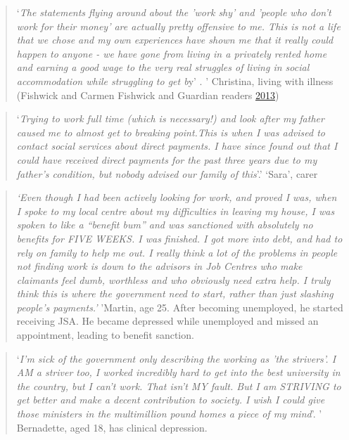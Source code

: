 \documentclass[]{tufte-handout}
\begin{document}
\begin{quote}
`\emph{The statements flying around about the 'work shy' and 'people who
don't work for their money' are actually pretty offensive to me. This is
not a life that we chose and my own experiences have shown me that it
really could happen to anyone - we have gone from living in a privately
rented home and earning a good wage to the very real struggles of living
in social accommodation while struggling to get b}y' . ' Christina,
living with illness (Fishwick and Carmen Fishwick and Guardian readers
\protect\hyperlink{ref-Fishwick2013}{2013})
\end{quote}

\begin{quote}
`\emph{Trying to work full time (which is necessary!) and look after my
father caused me to almost get to breaking point.This is when I was
advised to contact social services about direct payments. I have since
found out that I could have received direct payments for the past three
years due to my father's condition, but nobody advised our family of
this}'.' `Sara', carer
\end{quote}

\begin{quote}
\emph{`Even though I had been actively looking for work, and proved I
was, when I spoke to my local centre about my difficulties in leaving my
house, I was spoken to like a ``benefit bum'' and was sanctioned with
absolutely no benefits for FIVE WEEKS. I was finished. I got more into
debt, and had to rely on family to help me out. I really think a lot of
the problems in people not finding work is down to the advisors in Job
Centres who make claimants feel dumb, worthless and who obviously need
extra help. I truly think this is where the government need to start,
rather than just slashing people's payments.'} 'Martin, age 25. After
becoming unemployed, he started receiving JSA. He became depressed while
unemployed and missed an appointment, leading to benefit sanction.
\end{quote}

\begin{quote}
`\emph{I'm sick of the government only describing the working as 'the
strivers'. I AM a striver too, I worked incredibly hard to get into the
best university in the country, but I can't work. That isn't MY fault.
But I am STRIVING to get better and make a decent contribution to
society. I wish I could give those ministers in the multimillion pound
homes a piece of my mind}'. ' Bernadette, aged 18, has clinical
depression.
\end{quote}
\end{document}
